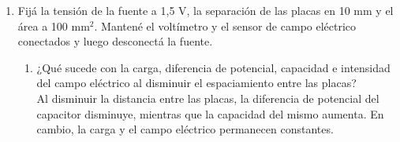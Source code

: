 \documentclass[12pt]{report}
\begin{document}
\begin{enumerate}
    \item Fijá la tensión de la fuente a 1,5 V, la separación de las placas en 10 mm y el área a 100 mm$^2$. Mantené el voltímetro y el sensor de campo eléctrico conectados y luego desconectá la fuente.
    \begin{enumerate}
        \item ¿Qué sucede con la carga, diferencia de potencial, capacidad e intensidad del campo eléctrico al disminuir el espaciamiento entre las placas?\\
      
        
            Al disminuir la distancia entre las placas, la diferencia de potencial del capacitor disminuye, mientras que la capacidad del mismo aumenta. En cambio, la carga  y el campo eléctrico permanecen constantes.\\
        

\end{enumerate}
\end{enumerate}
\end{document}
